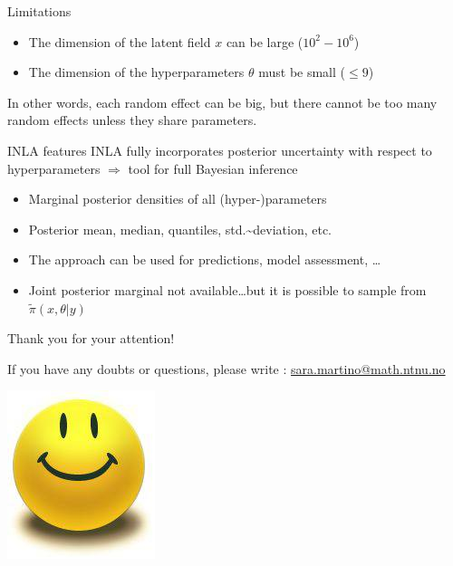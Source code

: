 \documentclass[
  ignorenonframetext,
]{beamer}
\providecommand{\tightlist}{%
  \setlength{\itemsep}{0pt}\setlength{\parskip}{0pt}}
\begin{document}
\begin{frame}{Limitations}
\protect\hypertarget{limitations}{}
\begin{itemize}
\item
  The dimension of the latent field \(x\) can be large (\(10^2-10^6\))
\item
  The dimension of the hyperparameters \(\theta\) must be small
  (\(\leq 9\))
\end{itemize}

In other words, each random effect can be big, but there cannot be too
many random effects unless they share parameters.
\end{frame}

\begin{frame}{INLA features}
\protect\hypertarget{inla-features}{}
INLA fully incorporates posterior uncertainty with respect to
hyperparameters \(\Rightarrow\) tool for full Bayesian inference

\begin{itemize}
\tightlist
\item
  Marginal posterior densities of all (hyper-)parameters
\item
  Posterior mean, median, quantiles, std.\textasciitilde deviation, etc.
\item
  The approach can be used for predictions, model assessment, \ldots
\item
  Joint posterior marginal not available\ldots but it is possible to
  sample from \(\widetilde{\pi}(x,\theta|y)\)
\end{itemize}
\end{frame}

\begin{frame}{}
\protect\hypertarget{section-1}{}
\Large

Thank you for your attention!

\normalsize

If you have any doubts or questions, please write :
\url{sara.martino@math.ntnu.no}

\begin{center}\includegraphics[width=0.3\linewidth]{graphics/smiley_small} \end{center}
\end{frame}
\end{document}
